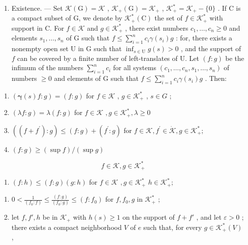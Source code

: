 \begin{enumerate}
\def\labelenumi{\Alph{enumi})}
\tightlist
\item
  Existence. --- Set \(\mathcal{K}(\mathrm{G}) = \mathcal{K}\) , \(\mathcal{K}_{+}(\mathrm{G}) = \mathcal{K}_{+}\) , \(\mathcal{K}_{+}^{*} = \mathcal{K}_{+} - \{0\}\) . If C is a compact subset of G, we denote by \(\mathcal{K}_{+}^{*}(\mathrm{C})\) the set of \(f \in \mathcal{K}_{+}^{*}\) with support in C. For \(f \in \mathcal{K}\) and \(g \in \mathcal{K}_{+}^{*}\) , there exist numbers \(c_{1}, \ldots, c_{n} \geqslant 0\) and elements \(s_{1}, \ldots, s_{n}\) of G such that \(f \leqslant \sum_{i=1}^{n} c_{i} \gamma(s_{i}) g\) : for, there exists a nonempty open set U in G such that \(\inf_{s \in \mathrm{U}} g(s) > 0\) , and the support of \(f\) can be covered by a finite number of left-translates of U. Let \((f : g)\) be the infimum of the numbers \(\sum_{i=1}^{n} c_{i}\) for all systems \((c_{1}, \ldots, c_{n}, s_{1}, \ldots, s_{n})\) of numbers \(\geqslant 0\) and elements of G such that \(f \leqslant \sum_{i=1}^{n} c_{i} \gamma(s_{i}) g\) . Then:
\end{enumerate}

\begin{enumerate}
\def\labelenumi{(\roman{enumi})}
\item
  \(\left(\pmb{\gamma}(s)f:g\right) = (f:g)\) for \(f\in \mathcal{K}\) , \(g\in \mathcal{K}_{+}^{*}\) , \(s\in G\) ;
\item
  \((\lambda f:g) = \lambda (f:g)\) for \(f\in \mathcal{K}\) \(,g\in \mathcal{K}_{+}^{*},\lambda \geqslant 0\)
\item
  \(\left((f + f^{\prime}):g\right)\leqslant (f:g) + (f^{\prime}:g)\) for \(f\in \mathcal{K},f^{\prime}\in \dot{\mathcal{K}},g\in \mathcal{K}_{+}^{*};\)
\item
  \((f:g)\geqslant (\sup f) / (\sup g)\)
\end{enumerate}

\[
f \in \mathscr {K}, g \in \mathscr {K} _ {+} ^ {*}
\]

\begin{enumerate}
\def\labelenumi{(\alph{enumi})}
\setcounter{enumi}{21}
\tightlist
\item
  \((f:h)\leqslant (f:g)(g:h)\) for \(f\in \mathcal{K}\) \(,g\in \mathcal{K}_{+}^{*}\) \(h\in \mathcal{K}_{+}^{*};\)
\end{enumerate}

\begin{enumerate}
\def\labelenumi{(\roman{enumi})}
\setcounter{enumi}{5}
\item
  \(0 < \frac{1}{(f_0:f)}\leqslant \frac{(f:g)}{(f_0:g)}\leqslant (f:f_0)\) for \(f,f_0,g\) in \(\mathcal{K}_+^*\) ;
\item
  let \(f, f', h\) be in \(\mathcal{K}_+\) with \(h(s) \geqslant 1\) on the support of \(f + f'\) , and let \(\varepsilon > 0\) ; there exists a compact neighborhood \(V\) of \(e\) such that, for every \(g \in \mathcal{K}_+^*(V)\) ,
\end{enumerate}

